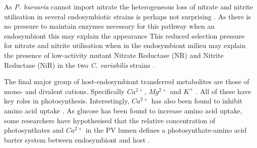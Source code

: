%

As \textit{P. bursaria} cannot import nitrate \citep{Albers1982} the heterogeneous
loss of nitrate and nitrite utilisation in several endosymbiotic strains 
is perhaps not surprising \citep{Kato2009a}.
As there is no pressure to maintain enzymes necessary for this pathway when an endosymbiont
this may explain the appearance 
This reduced selection pressure for nitrate and nitrite utilisation when in the endosymbiont
milieu may explain the presence of low-activity mutant Nitrate Reductase (NR) and Nitrite
Reductase (NiR) in the two \textit{C. variabilis} strains \citep{Kato2009a}. 


%

The final major group of host-endosymbiont transferred metabolites
are those of mono- and divalent cations.  Specifically
\(Ca^{2+}\), \(Mg^{2+}\) and \(K^{+}\) \citep{Kato2009a}.  All of 
these have key roles in photosynthesis.
Interestingly, \(Ca^{2+}\) has also been found to inhibit amino acid uptake \citep{Kato2008}.
As glucose has been found to increase amino acid uptake, some researchers
have hypothesised that the relative concentration of photosynthates
and \(Ca^{2+}\) in the PV lumen defines a photosynthate-amino acid
barter system between endosymbiont and host \citep{Kato2009a}.

